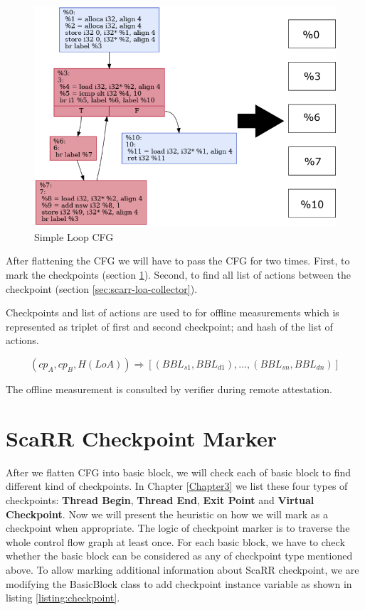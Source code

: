 \begin{figure}[htbp]
\centerline{\includegraphics[scale=.70]{Figures/04/flatten-cfg.png}}
\caption{Simple Loop CFG}
\label{fig:simple-loop-cfg}
\end{figure}

After flattening the CFG we will have to pass the CFG for two times. First, to mark the checkpoints (section \ref{sec:scarr-checkpoint-marker}). 
Second, to find all list of actions between the checkpoint (section \ref{sec:scarr-loa-collector}).

Checkpoints and list of actions are used to for offline measurements which is represented as triplet of first and second checkpoint; and hash of 
the list of actions.

$$(cp_A, cp_B, H(LoA)) \Rightarrow [(BBL_{s1}, BBL_{d1}), ..., (BBL_{sn}, BBL_{dn})]$$

The offline measurement is consulted by verifier during remote attestation.

\section{ScaRR Checkpoint Marker} 
\label{sec:scarr-checkpoint-marker}

After we flatten CFG into basic block, we will check each of basic block to 
find different kind of checkpoints. In Chapter \ref{Chapter3} we list these four
types of checkpoints: \textbf{Thread Begin}, \textbf{Thread End}, \textbf{Exit Point} and \textbf{Virtual Checkpoint}. Now we will present the heuristic
on how we will mark as a checkpoint when appropriate.  The logic of checkpoint marker is to traverse the whole control flow graph at least once. For each basic block, we have to check whether the basic block can be considered as any of checkpoint type mentioned above. To allow marking additional information about ScaRR checkpoint, we are modifying the BasicBlock class to add checkpoint instance variable as shown in listing \ref{listing:checkpoint}.

